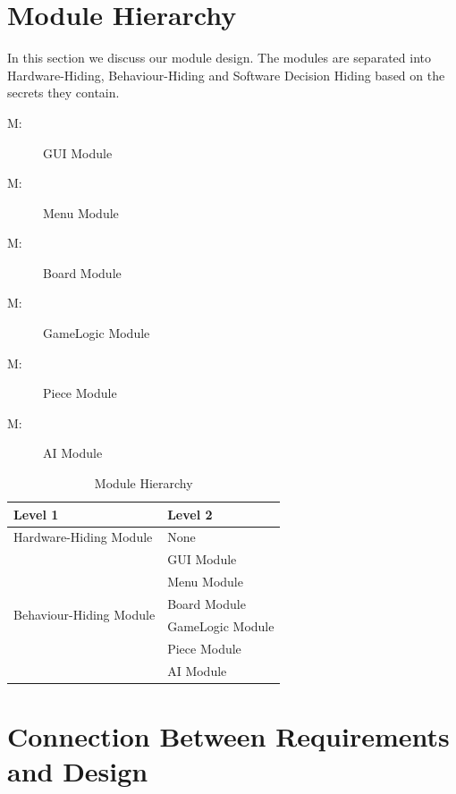 \documentclass[12pt, titlepage]{article}
\newcounter{mnum}
\newcommand{\mthemnum}{M\themnum}
\begin{document}
\section{Module Hierarchy} \label{SecMH}

In this section we discuss our module design. The modules are separated into Hardware-Hiding, Behaviour-Hiding and Software Decision Hiding based on the secrets they contain. 

\begin{description}
\item [ \mthemnum \label{mGUI}:] GUI Module
\item [ \mthemnum \label{mM}:] Menu Module
\item [ \mthemnum \label{mB}:] Board Module
\item [ \mthemnum \label{mG}:] GameLogic Module
\item [ \mthemnum \label{mP}:] Piece Module
\item [ \mthemnum \label{mA}:] AI Module
\end{description}


\begin{table}[h!]
\centering
\begin{tabular}{p{} p{}}
\toprule
\textbf{Level 1} & \textbf{Level 2}\\
\midrule

{Hardware-Hiding Module} & None \\
\midrule

\multirow{7}{0.3\textwidth}{Behaviour-Hiding Module} & GUI Module\\
& Menu Module\\
& Board Module\\
& GameLogic Module\\
& Piece Module\\
\midrule

\multirow{1}{0.3\textwidth}{Software Decision Module} & AI Module\\
\bottomrule

\end{tabular}
\caption{Module Hierarchy}
\label{TblMH}
\end{table}

\section{Connection Between Requirements and Design} \label{SecConnection}
\end{document}
